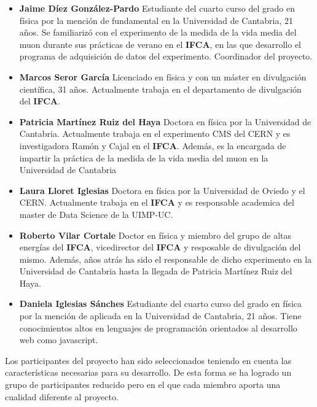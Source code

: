 \documentclass[11pt]{extarticle}
\begin{document}
				\begin{itemize}
					\item \textbf{Jaime Díez González-Pardo} Estudiante del cuarto curso del grado en física por la mención de fundamental en la Universidad de Cantabria, 21 años. Se familiarizó con el experimento de la medida de la vida media del muon durante sus prácticas de verano en el \textbf{IFCA}, en las que desarrollo el programa de adquisición de datos del experimento. Coordinador del proyecto. 

					\item \textbf{Marcos Seror García} Licenciado en física y con un máster en divulgación científica, 31 años. Actualmente trabaja en el departamento de divulgación del \textbf{IFCA}.

					\item \textbf{Patricia Martínez Ruiz del Haya} Doctora en física por la Universidad de Cantabria. Actualmente trabaja en el experimento CMS del CERN y es investigadora Ramón y Cajal en el \textbf{IFCA}. Además, es la encargada de impartir la práctica de la medida de la vida media del muon en la Universidad de Cantabria 
					
					\item \textbf{Laura Lloret Iglesias} Doctora en física por la Universidad de Oviedo y el CERN. Actualmente trabaja en el \textbf{IFCA} y es responsable academica del master de Data Science de la UIMP-UC.

					\item \textbf{Roberto Vilar Cortale} Doctor en física y miembro del grupo de altas energías del \textbf{IFCA}, vicedirector del \textbf{IFCA} y resposable de divulgación del mismo. Además, años atrás ha sido el responsable de dicho experimento en la Universidad de Cantabria hasta la llegada de Patricia Martínez Ruiz del Haya.

					\item \textbf{Daniela Iglesias Sánches} Estudiante del cuarto curso del grado en física por la mención de aplicada en la Universidad de Cantabria, 21 años. Tiene conocimientos altos en lenguajes de programación orientados al desarrollo web como javascript.
				\end{itemize}

				Los participantes del proyecto han sido seleccionados teniendo en cuenta las características necesarias para su desarrollo. De esta forma se ha logrado un grupo de participantes reducido pero en el que cada miembro aporta una cualidad diferente al proyecto.
\end{document}
